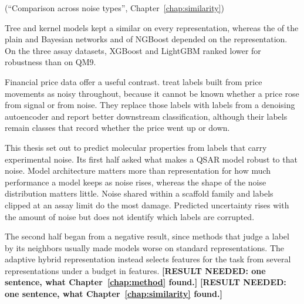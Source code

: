  (``Comparison across noise types'', Chapter~\ref{chap:similarity})

Tree and kernel models kept a similar \aucnorm{} on every representation, whereas the \aucnorm{} of the plain and Bayesian networks and of NGBoost depended on the representation. On the three assay datasets, XGBoost and LightGBM ranked lower for robustness than on QM9.

Financial price data offer a useful contrast. \citet{Ma2022} treat labels built from price movements as noisy throughout, because it cannot be known whether a price rose from signal or from noise. They replace those labels with labels from a denoising autoencoder and report better downstream classification, although their labels remain classes that record whether the price went up or down.

This thesis set out to predict molecular properties from labels that carry experimental noise. Its first half asked what makes a QSAR model robust to that noise. Model architecture matters more than representation for how much performance a model keeps as noise rises, whereas the shape of the noise distribution matters little. Noise shared within a scaffold family and labels clipped at an assay limit do the most damage. Predicted uncertainty rises with the amount of noise but does not identify which labels are corrupted.

The second half began from a negative result, since methods that judge a label by its neighbors usually made models worse on standard representations. The adaptive hybrid representation instead selects features for the task from several representations under a budget in features. \textbf{[RESULT NEEDED: one sentence, what Chapter~\ref{chap:method} found.]} \textbf{[RESULT NEEDED: one sentence, what Chapter~\ref{chap:similarity} found.]}

